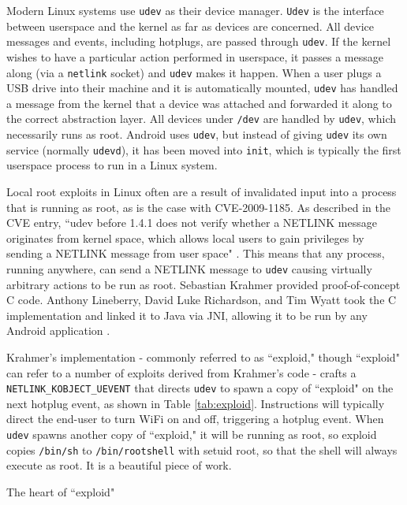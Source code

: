 Modern Linux systems use \texttt{udev} as their device manager.  \texttt{Udev} is the interface between userspace and the kernel as
far as devices are concerned.  All device messages and events, including hotplugs, are passed through \texttt{udev}.  If the kernel
wishes to have a particular action performed in userspace, it passes a message along (via a \texttt{netlink} socket) and
\texttt{udev} makes it happen.  When a user plugs a USB drive into their machine and it is automatically mounted, \texttt{udev} has
handled a message from the kernel that a device was attached and forwarded it along to the correct abstraction layer.  All devices
under \texttt{/dev} are handled by \texttt{udev}, which necessarily runs as root.  Android uses \texttt{udev}, but instead
of giving \texttt{udev} its own service (normally \texttt{udevd}), it has been moved into \texttt{init}, which is typically the
first userspace process to run in a Linux system.

Local root exploits in Linux often are a result of invalidated input into a process that is running as root, as is the case with
CVE-2009-1185.  As described in the CVE entry, ``udev before 1.4.1 does not verify whether a NETLINK message originates from kernel
space, which allows local users to gain privileges by sending a NETLINK message from user space" \cite{udevcve}.  This means that
any process, running anywhere, can send a NETLINK message to \texttt{udev} causing virtually arbitrary actions to be run as root.
Sebastian Krahmer provided proof-of-concept C code.  Anthony Lineberry, David Luke Richardson, and Tim Wyatt took the C
implementation and linked it to Java via JNI, allowing it to be run by any Android application \cite{arentpermissions}.

Krahmer's implementation - commonly referred to as ``exploid," though ``exploid" can refer to a number of exploits derived from
Krahmer's code - crafts a \texttt{NETLINK\_KOBJECT\_UEVENT} that directs \texttt{udev} to spawn a copy of ``exploid" on the next
hotplug event, as shown in Table \ref{tab:exploid}.  Instructions will typically direct the end-user to turn WiFi on and off,
triggering a hotplug event.  When \texttt{udev} spawns another copy of ``exploid," it will be running as root, so exploid copies
\texttt{/bin/sh} to \texttt{/bin/rootshell} with setuid root, so that the shell will always execute as root.  It is a beautiful
piece of work.

\begin{table}[htpb]

\caption{The heart of ``exploid"}
\label{tab:exploid}
\end{table}

